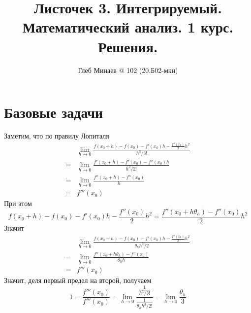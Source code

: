 \documentclass[12pt,a4paper]{article}
\title{Листочек 3. Интегрируемый.\\Математический анализ. 1 курс.\\Решения.}
\author{Глеб Минаев @ 102 (20.Б02-мкн)}
\begin{document}
    \maketitle

    \begin{multicols}{2}
        \tableofcontents
    \end{multicols}

    \section*{Базовые задачи}

    \begin{enumproblem}
        Заметим, что по правилу Лопиталя
        \begin{align*}
            &\lim_{h \to 0} \frac{f(x_0 + h) - f(x_0) - f'(x_0) h - \frac{f''(x_0)}{2} h^2}{h^3/3!}\\
            =& \lim_{h \to 0} \frac{f'(x_0 + h) - f'(x_0) - f''(x_0) h}{h^2/2!}\\
            =& \lim_{h \to 0} \frac{f''(x_0 + h) - f''(x_0)}{h}\\
            =& f'''(x_0)
        \end{align*}
        При этом
        \[f(x_0 + h) - f(x_0) - f'(x_0) h - \frac{f''(x_0)}{2} h^2 = \frac{f''(x_0 + h\theta_h) - f''(x_0)}{2} h^2\]
        Значит
        \begin{align*}
            &\lim_{h \to 0} \frac{f(x_0 + h) - f(x_0) - f'(x_0) h - \frac{f''(x_0)}{2} h^2}{\theta_h h^3/2}\\
            =& \lim_{h \to 0} \frac{f''(x_0 + h \theta_h) - f''(x_0)}{\theta_h h}\\
            =& f'''(x_0)
        \end{align*}
        Значит, деля первый предел на второй, получаем
        \[
            1
            = \frac{f'''(x_0)}{f'''(x_0)}
            = \lim_{h \to 0} \frac{\frac{1}{h^3/3!}}{\frac{1}{\theta_h h^3/ 2!}}
            = \lim_{h \to 0} \frac{\theta_h}{3}
        \]
    \end{enumproblem}
\end{document}
